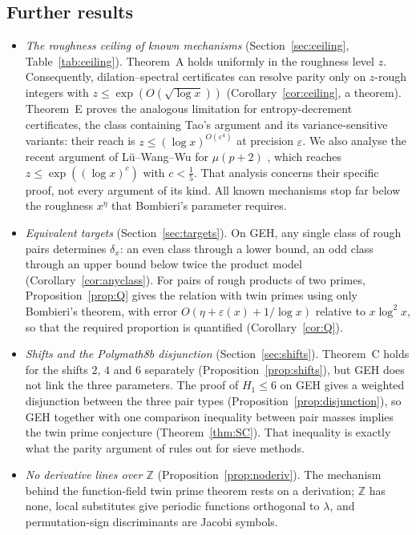 \documentclass[11pt]{amsart}
\theoremstyle{definition}
\theoremstyle{remark}
\begin{document}
\subsection{Further results}
\begin{itemize}
\item \emph{The roughness ceiling of known mechanisms} (Section~\ref{sec:ceiling}, Table~\ref{tab:ceiling}). Theorem~A holds uniformly in the roughness level $z$. Consequently, dilation--spectral certificates can resolve parity only on $z$-rough integers with $z\le\exp(O(\sqrt{\log x}))$ (Corollary~\ref{cor:ceiling}, a theorem). Theorem~E proves the analogous limitation for entropy-decrement certificates, the class containing Tao's argument and its variance-sensitive variants: their reach is $z\le(\log x)^{O(\varepsilon^4)}$ at precision $\varepsilon$. We also analyse the recent argument of Lü--Wang--Wu for $\mu(p+2)$ \cite{LWW26}, which reaches $z\le\exp((\log x)^c)$ with $c<\frac15$. That analysis concerns their specific proof, not every argument of its kind. All known mechanisms stop far below the roughness $x^\eta$ that Bombieri's parameter requires.
\item \emph{Equivalent targets} (Section~\ref{sec:targets}). On GEH, any single class of rough pairs determines $\delta_x$: an even class through a lower bound, an odd class through an upper bound below twice the product model (Corollary~\ref{cor:anyclass}). For pairs of rough products of two primes, Proposition~\ref{prop:Q} gives the relation with twin primes using only Bombieri's theorem, with error $O(\eta+\varepsilon(x)+1/\log x)$ relative to $x\log^2x$, so that the required proportion is quantified (Corollary~\ref{cor:Q}).
\item \emph{Shifts and the Polymath8b disjunction} (Section~\ref{sec:shifts}). Theorem~C holds for the shifts $2$, $4$ and $6$ separately (Proposition~\ref{prop:shifts}), but GEH does not link the three parameters. The proof of $H_1\le6$ on GEH \cite{Polymath8b} gives a weighted disjunction between the three pair types (Proposition~\ref{prop:disjunction}), so GEH together with one comparison inequality between pair masses implies the twin prime conjecture (Theorem~\ref{thm:SC}). That inequality is exactly what the parity argument of \cite[\S8]{Polymath8b} rules out for sieve methods.
\item \emph{No derivative lines over $\mathbb Z$} (Proposition~\ref{prop:noderiv}). The mechanism behind the function-field twin prime theorem \cite{SS22} rests on a derivation; $\mathbb Z$ has none, local substitutes give periodic functions orthogonal to $\lambda$, and permutation-sign discriminants are Jacobi symbols.

\end{itemize}
\end{document}
